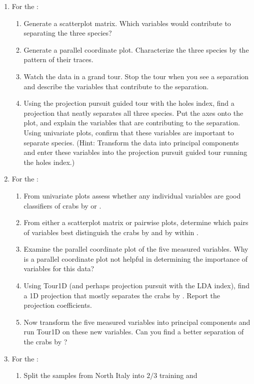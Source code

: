 \begin{enumerate}
\item For the :
\begin{enumerate} 
\item
Generate a scatterplot matrix. Which variables would contribute to
separating the three species?
\item
Generate a parallel coordinate plot.  Characterize the three species
by the pattern of their traces.
\item
Watch the data in a grand tour. Stop the tour when you see a
separation and describe the variables that contribute to the
separation.
\item
Using the projection pursuit guided tour with the holes index, find a
projection that neatly separates all three species. Put the axes onto
the plot, and explain the variables that are contributing to the
separation. Using univariate plots, confirm that these variables are
important to separate species. (Hint: Transform the data into principal
components and enter these variables into the projection pursuit
guided tour running the holes index.)
\end{enumerate}
\item For the :
\begin{enumerate}
\item
From univariate plots assess whether any individual variables are good
classifiers of crabs by  or .
\item From either a scatterplot matrix or pairwise plots, determine
which pairs of variables best distinguish the crabs by 
and by  within .
\item Examine the parallel coordinate plot of the five measured
variables.  Why is a parallel coordinate plot not helpful in determining
the importance of variables for this data?
\item Using Tour1D (and perhaps projection pursuit with the LDA
index), find a 1D projection that mostly separates the crabs by
. Report the projection coefficients.
\item Now transform the five measured variables into principal components
and run Tour1D on these new variables. Can you find a better
separation of the crabs by ?
\end{enumerate}
\item For the :
\begin{enumerate}
\item Split the samples from North Italy into $2/3$ training and

\end{enumerate}
\end{enumerate}
